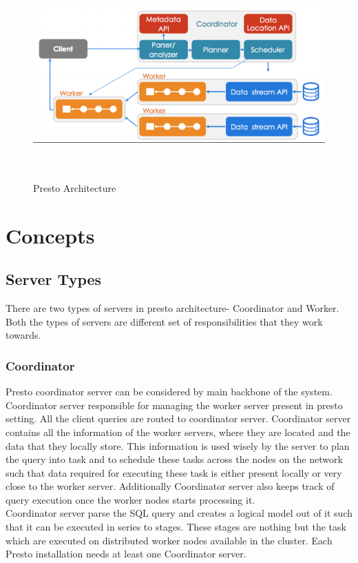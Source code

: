 \begin{figure}
\includegraphics[height=8cm, width=15cm,keepaspectratio]{presto-architecture}
\caption{Presto Architecture}
\end{figure}


\section{Concepts}
\subsection{Server Types}
There are two types of servers in presto architecture- Coordinator and Worker.
Both the types of servers are different set of responsibilities that they work
towards.
\subsubsection{Coordinator}
Presto coordinator server can be considered by main backbone of the system.
Coordinator server responsible for managing the worker server present in presto
setting. All the client queries are routed to coordinator server. Coordinator
server contains all the information of the worker servers, where they are
located and the data that they locally store. This information is used wisely
by the server to plan the query into task and to schedule these tasks across the
nodes on the network such that data required for executing these task is either
present locally or very close to the worker server. Additionally Coordinator
server also keeps track of query execution once the worker nodes starts
processing it.\\
Coordinator server parse the SQL query and creates a logical model out of it
such that it can be executed in series to stages. These stages are nothing but
the task which are executed on distributed worker nodes available in the
cluster. Each Presto installation needs at least one Coordinator server.

